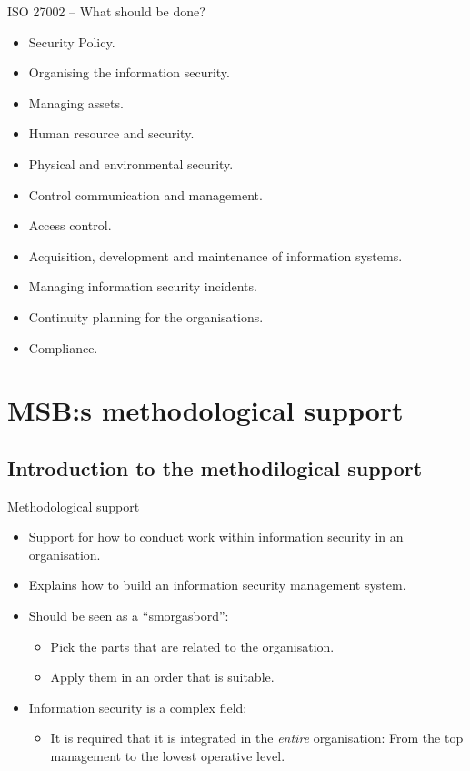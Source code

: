 \documentclass{beamer}
\begin{document}
\begin{frame}{ISO 27002 -- What should be done?}
  \begin{itemize}
    \item Security Policy.
    \item Organising the information security.
    \item Managing assets.
    \item Human resource and security.
    \item Physical and environmental security.
    \item Control communication and management.
    \item Access control.
    \item Acquisition, development and maintenance of information systems.
    \item Managing information security incidents.
    \item Continuity planning for the organisations.
    \item Compliance.
  \end{itemize}
\end{frame}

\section[Methodilogical support]{MSB:s methodological support}
\subsection{Introduction to the methodilogical support}

\begin{frame}{Methodological support}
  \begin{itemize}
    \item Support for how to conduct work within information security in an
      organisation.

    \item Explains how to build an information security management system.

    \item Should be seen as a \enquote{smorgasbord}:
      \begin{itemize}
        \item Pick the parts that are related to the organisation.
        \item Apply them in an order that is suitable.
      \end{itemize}

    \item Information security is a complex field:
      \begin{itemize}
        \item It is required that it is integrated in the \emph{entire}
          organisation: From the top management to the lowest operative level.
      \end{itemize}

  \end{itemize}
\end{frame}
\end{document}
